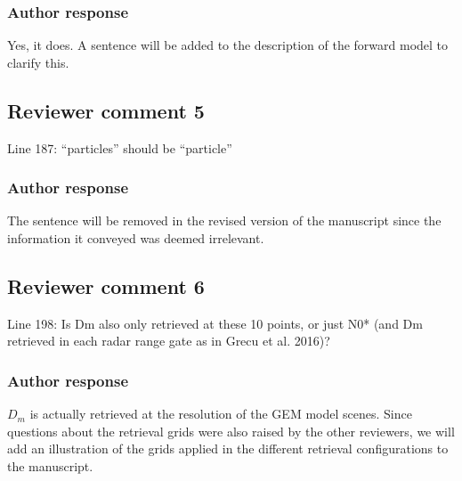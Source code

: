 \documentclass[11pt]{scrartcl}
\providecommand{\DIFadd}[1]{{\protect\textcolor{blue}{\uwave{#1}}}} %
\providecommand{\DIFdel}[1]{{\protect\textcolor{red}{\sout{#1}}}}                      %
\providecommand{\DIFaddbegin}{} %
\providecommand{\DIFaddend}{} %
\providecommand{\DIFdelbegin}{} %
\newenvironment{change}[1][]{%
  \begin{mdframed}[frametitle={Line #1:}]%
}{%
  \end{mdframed}%
}
\begin{document}
\begin{itemize}
\subsubsection*{Author response}

Yes, it does. A sentence will be added to the description of the forward model
to clarify this.



\subsection*{Reviewer comment 5}
Line 187: “particles” should be “particle”

\subsubsection*{Author response}

The sentence will be removed in the revised version of the manuscript since
the information it conveyed was deemed irrelevant.



\subsection*{Reviewer comment 6}
Line 198: Is Dm also only retrieved at these 10 points, or just N0* (and Dm retrieved in each radar range gate as in Grecu et al. 2016)?

\subsubsection*{Author response}

$D_m$ is actually retrieved at the resolution of the GEM model scenes. Since
questions about the retrieval grids were also raised by the other reviewers, we
will add an illustration of the grids applied in the different retrieval
configurations to the manuscript.


\end{itemize}
\end{document}
